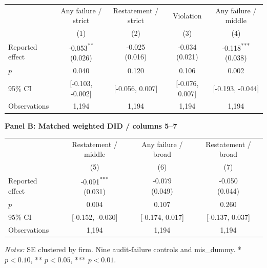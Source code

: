 \documentclass[10pt]{article}
\newcommand{\sym}[1]{\textsuperscript{#1}}
\begin{document}
\begin{tabular*}{\textwidth}{@{\extracolsep{\fill}}lcccc@{}}
\toprule
 & Any failure / strict & Restatement / strict & Violation & Any failure / middle \\
 & (1) & (2) & (3) & (4) \\
\midrule
Reported effect & \shortstack{-0.053\sym{**}\\(0.026)} & \shortstack{-0.025\\(0.016)} & \shortstack{-0.034\\(0.021)} & \shortstack{-0.118\sym{***}\\(0.038)} \\
$p$ & 0.040 & 0.120 & 0.106 & 0.002 \\
95\% CI & [-0.103, -0.002] & [-0.056, 0.007] & [-0.076, 0.007] & [-0.193, -0.044] \\
Observations & 1,194 & 1,194 & 1,194 & 1,194 \\
\bottomrule\end{tabular*}\par
\medskip\textbf{Panel B: Matched weighted DID / columns 5--7}\par\smallskip
\begin{tabular*}{\textwidth}{@{\extracolsep{\fill}}lccc@{}}
\toprule
 & Restatement / middle & Any failure / broad & Restatement / broad \\
 & (5) & (6) & (7) \\
\midrule
Reported effect & \shortstack{-0.091\sym{***}\\(0.031)} & \shortstack{-0.079\\(0.049)} & \shortstack{-0.050\\(0.044)} \\
$p$ & 0.004 & 0.107 & 0.260 \\
95\% CI & [-0.152, -0.030] & [-0.174, 0.017] & [-0.137, 0.037] \\
Observations & 1,194 & 1,194 & 1,194 \\
\bottomrule\end{tabular*}\par
\medskip\fontsize{9}{11}\selectfont\textit{Notes:} SE clustered by firm. Nine audit-failure controls and mis\_dummy. * $p<0.10$, ** $p<0.05$, *** $p<0.01$.
\end{document}

